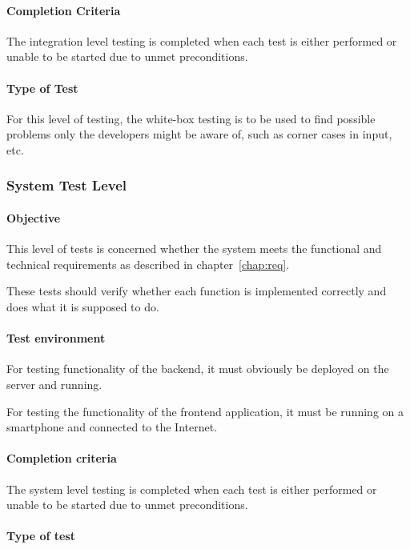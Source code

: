 \documentclass[11pt]{book}
\begin{document}
\paragraph{Completion Criteria}

The integration level testing is completed when each test is either performed or unable to be started due to unmet preconditions.

\paragraph{Type of Test}

For this level of testing, the white-box testing is to be used to find possible problems only the developers might be aware of, such as corner cases in input, etc.


\subsubsection{System Test Level}

\paragraph{Objective}

This level of tests is concerned whether the system meets the functional and technical requirements as described in chapter~\ref{chap:req}.

These tests should verify whether each function is implemented correctly and does what it is supposed to do.

\paragraph{Test environment}

For testing functionality of the backend, it must obviously be deployed on the server and running.

For testing the functionality of the frontend application, it must be running on a smartphone and connected to the Internet.

\paragraph{Completion criteria}

The system level testing is completed when each test is either performed or unable to be started due to unmet preconditions.

\paragraph{Type of test}
\end{document}
